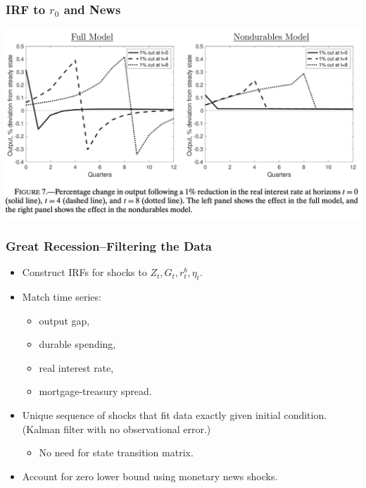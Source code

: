 \documentclass[english,xcolor=svgnames]{beamer}
\begin{document}
\begin{frame}
    \frametitle{IRF to $r_0$ and News}
    \begin{center}
    	\includegraphics[scale=0.3]{figures/MWFIG7.png}	
    \end{center}
\end{frame}

\begin{frame}\frametitle{Great Recession--Filtering the Data}
\begin{itemize}
\item Construct IRFs for shocks to $Z_t,G_t,r^b_t,\eta_t$. \vfill
\item Match time series:
	\begin{itemize}
	\item output gap, 
	\item durable spending,
	\item real interest rate,
	\item mortgage-treasury spread.
	\end{itemize} \vfill
\item Unique sequence of shocks that fit data exactly given initial condition. (Kalman filter with no observational error.)
\begin{itemize}
	\item No need for state transition matrix.\vfill
	\end{itemize}
\item Account for zero lower bound using monetary news shocks.
\end{itemize}
\end{frame}
\end{document}
